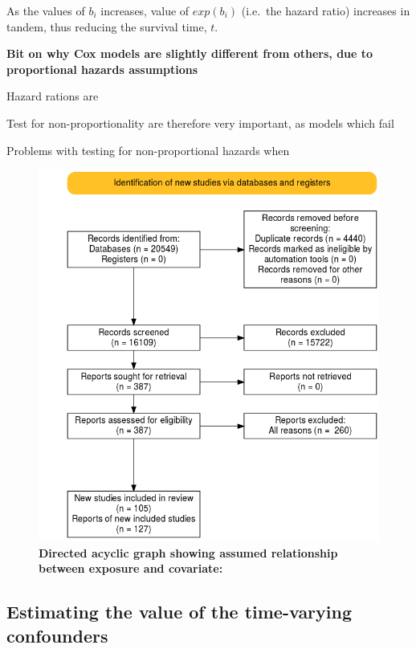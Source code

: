 \documentclass[a4paper, twoside]{templates/ociamthesis}
\begin{document}
As the values of \(b_i\) increases, value of \(exp(b_i)\) (i.e.~the hazard ratio) increases in tandem, thus reducing the survival time, \(t\).

\textbf{Bit on why Cox models are slightly different from others, due to proportional hazards assumptions}

Hazard rations are

Test for non-proportionality are therefore very important, as models which fail

Problems with testing for non-proportional hazards when





\begin{figure}
\includegraphics[width=1\linewidth]{figures/sys-rev/prisma_flow} \caption[Directed acyclic graph showing assumed relationship between exposure and covariate]{\textbf{Directed acyclic graph showing assumed relationship between exposure and covariate:}}\label{fig:cprd-dag-1}
\end{figure}

\hypertarget{estimating-the-value-of-the-time-varying-confounders}{%
\subsection{Estimating the value of the time-varying confounders}\label{estimating-the-value-of-the-time-varying-confounders}}
\end{document}
